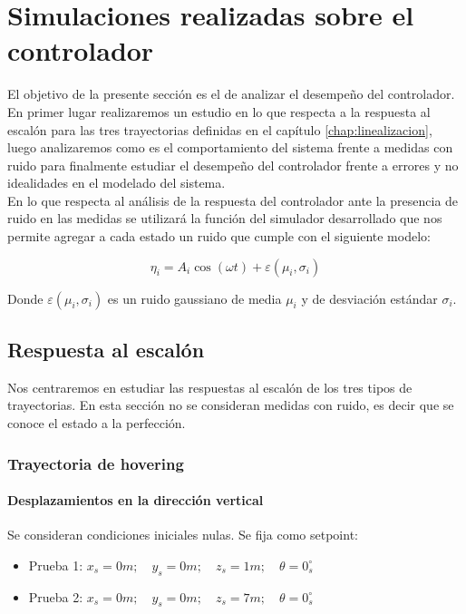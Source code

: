 \documentclass[main]{subfiles}
\begin{document}
\chapter{Simulaciones realizadas sobre el controlador}
\label{chap:sim_control}

El objetivo de la presente secci\'on es el de analizar el desempeño del controlador. En primer lugar realizaremos un estudio en lo que respecta a la respuesta al escal\'on para las tres trayectorias definidas en el cap\'itulo \ref{chap:linealizacion}, luego analizaremos como es el comportamiento del sistema frente a medidas con ruido para finalmente estudiar el desempeño del controlador frente a errores y no idealidades en el modelado del sistema.\\

En lo que respecta al an\'alisis de la respuesta del controlador ante la presencia de ruido en las medidas se utilizar\'a la funci\'on del simulador desarrollado que nos permite agregar a cada estado un ruido que cumple con el siguiente modelo:

\begin{equation}
\label{eq:noise}
\eta_i = A_i\cos(\omega t)+\varepsilon(\mu_i,\sigma_i)
\end{equation}

Donde $\varepsilon(\mu_i,\sigma_i)$ es un ruido gaussiano de media $\mu_i$ y de desviaci\'on est\'andar $\sigma_i$.

\section{Respuesta al escal\'on}
Nos centraremos en estudiar las respuestas al escal\'on de los tres tipos de trayectorias. En esta secci\'on no se consideran medidas con ruido, es decir que se conoce el estado a la perfecci\'on.  

\subsection{Trayectoria de hovering}

\subsubsection{Desplazamientos en la direcci\'on vertical}
Se consideran condiciones iniciales nulas. Se fija como setpoint:
\begin{itemize}
\item Prueba 1: ${x_s = 0 m;\quad y_s = 0 m;\quad z_s = 1 m;\quad \theta = 0_s^\circ}$
\item Prueba 2: ${x_s = 0 m;\quad y_s = 0 m;\quad z_s = 7 m;\quad \theta = 0_s^\circ}$
\end{itemize}
\end{document}
